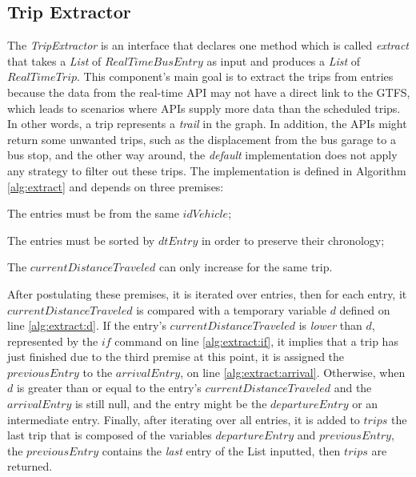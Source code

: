 \subsection{Trip Extractor}
\label{sub:2}
The \textit{TripExtractor} is an interface that declares one method which is called
\textit{extract} that takes a \textit{List} of $RealTimeBusEntry$ as input and produces
a \textit{List} of $RealTimeTrip$. This component's main goal is to extract the trips from
entries because the data from the real-time API may not have a direct link to the GTFS, 
which leads to scenarios where APIs supply more data than the scheduled trips.
In other words, a trip represents a {\em trail} in the graph.
In addition, the APIs might return some unwanted trips, such as the displacement 
from the bus garage to a bus stop, and the other way around,
the{ \em default} implementation does not apply any strategy to filter out these 
trips. The implementation is defined in Algorithm \ref{alg:extract} and depends on three premises:
\begin{enumerate*}
    \item The entries must be from the same $idVehicle$;
    \item The entries must be sorted by $dtEntry$ in order to preserve their chronology;
    \item The $currentDistanceTraveled$ can only increase for the same trip.
\end{enumerate*}

After postulating these premises, it is iterated over entries, then for each entry,
it $currentDistanceTraveled$ is compared with a temporary variable $d$ defined on
line \ref{alg:extract:d}. If the entry's $currentDistanceTraveled$ is{ \em lower} 
than $d$, represented by the $if$ command on 
line \ref{alg:extract:if}, it implies that a trip has just finished due to the third premise at 
this point, it is assigned the $previousEntry$ to the $arrivalEntry$, on
line \ref{alg:extract:arrival}.
Otherwise, when $d$ is greater than or equal to the entry's 
$currentDistanceTraveled$ and the $arrivalEntry$ is still null, and the entry might be the $departureEntry$ or an intermediate entry.
Finally, after iterating over all entries, it is added to $trips$ the 
last trip that is composed of the variables $departureEntry$ and $previousEntry$,
the $previousEntry$ contains the{ \em last} entry of the List inputted, then 
$trips$ are returned.

